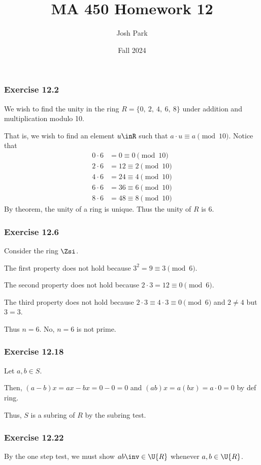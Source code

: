 \documentclass{article}
\author{Josh Park}
\date{\vspace*{-1em}Fall 2024}
\title{\vspace*{-2em}MA 450 Homework 12\vspace*{-1em}}
\begin{document}
\maketitle
\subsubsection*{Exercise 12.2}

We wish to find the unity in the ring \( R = \{0,\ 2,\ 4,\ 6,\ 8\} \) under addition and multiplication modulo 10.

That is, we wish to find an element \( u\inR \) such that \( a\cdot u \equiv a \pmod{10}\). Notice that
\begin{align*}
  0\cdot 6 &= 0 \equiv 0 \pmod{10} \\
  2\cdot 6 &= 12 \equiv 2 \pmod{10} \\
  4\cdot 6 &= 24 \equiv 4 \pmod{10} \\
  6\cdot 6 &= 36 \equiv 6 \pmod{10} \\
  8\cdot 6 &= 48 \equiv 8 \pmod{10}
\end{align*}
By theorem, the unity of a ring is unique. Thus the unity of \( R \) is \( 6 \).

\subsubsection*{Exercise 12.6}
Consider the ring \( \Zsi \).

The first property does not hold because \( 3^2 = 9 \equiv 3 \pmod{6} \).

The second property does not hold because \( 2\cdot 3 = 12 \equiv 0 \pmod{6} \).

The third property does not hold because \( 2\cdot 3 \equiv 4\cdot 3\equiv 0 \pmod{6} \) and \( 2\neq 4 \) but \( 3=3 \).

Thus \( n = 6 \). No, \( n = 6 \) is not prime.

\subsubsection*{Exercise 12.18}
Let \( a,b \in S \).

Then, \( (a-b)x = ax-bx = 0-0 = 0\) and \( (ab)x = a(bx) = a\cdot 0 = 0 \) by def ring.

Thus, \( S \) is a subring of \( R \) by the subring test.


\subsubsection*{Exercise 12.22}
By the one step test, we must show \( ab\inv \in \U{R} \) whenever \( a,b\in \U{R} \).
\end{document}
